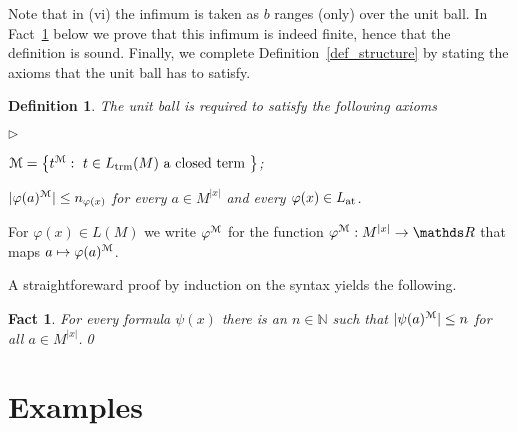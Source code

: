 \documentclass[12pt,letterpaper,oneside,reqno]{amsart}
\newcommand{\mylabel}[1]{{#1}\hfill}
\renewenvironment{itemize}
  {\begin{list}{$\triangleright$}{%
   \setlength{\parskip}{0mm}
   \setlength{\topsep}{.2\baselineskip}
   \setlength{\rightmargin}{0mm}
   \setlength{\listparindent}{0mm}
   \setlength{\itemindent}{0mm}
   \setlength{\labelwidth}{3ex}
   \setlength{\itemsep}{.2\baselineskip}
   \setlength{\parsep}{.2\baselineskip}
   \setlength{\partopsep}{0mm}
   \setlength{\labelsep}{1ex}
   \setlength{\leftmargin}{\labelwidth+\labelsep}
   \let\makelabel\mylabel}}{%
   \end{list}}
\theoremstyle{plain}
\newtheorem{fact}[theorem]{Fact}
\newtheorem{definition}[theorem]{Definition}
\theoremstyle{remark}
\begin{document}
Note that in (vi) the infimum is taken as $b$ ranges (only) over the unit ball. 
In Fact~\ref{fact_finiteness} below we prove that this infimum is indeed finite, hence that the definition is sound. 
Finally, we complete Definition~\ref{def_structure} by stating the axioms that the unit ball has to satisfy.

\begin{definition}\label{def_unitball}
  The unit ball is required to satisfy the following axioms
  \begin{itemize}
    \item[1.] ${\EuScript M}=\big\{t^{\EuScript M}:\ t\in L_{\rm trm}(M) \textrm{ a closed term }\big\}$;
    \item[2.] $|\varphi(a)^{\EuScript M}|\le n_{\varphi(x)}$ for every $a\in M^{|x|}$ and every $\varphi(x)\in L_{\rm at}$.
  \end{itemize}
\end{definition}

For $\varphi(x)\in L(M)$ we write $\varphi^{\EuScript M}$ for the function $\varphi^{\EuScript M}:M^{|x|}\to{\mathds R}$ that maps $a\mapsto\varphi(a)^{\EuScript M}$.

A straightforeward proof by induction on the syntax yields the following.

\begin{fact}\label{fact_finiteness}
  For every formula $\psi(x)$ there is an $n\in{\mathds N}$ such that $|\psi(a)^{\EuScript M}|\le n$ for all $a\in M^{|x|}$.\qed
\end{fact}


\section{Examples}

\def\ceq#1#2#3{\parbox[t]{25ex}{$\displaystyle #1$}\parbox{5ex}{\hfil $#2$}{$\displaystyle #3$}}
\end{document}
